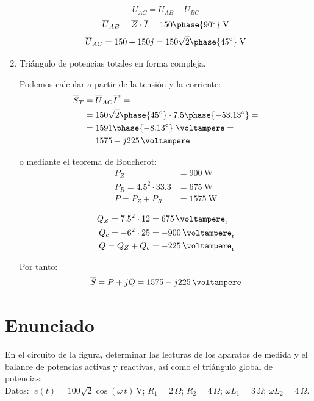 \begin{enumerate}
  \[
    \overline{U}_{AC} = \overline{U}_{AB} + \overline{U}_{BC}
  \]
  \[
    \overline{U}_{AB} = \overline{Z} \cdot \overline{I} = 150\phase{\ang{90}}\;\si{\volt}
  \]
  \[
    \overline{U}_{AC} = 150 + 150j = 150\sqrt{2}\phase{\ang{45}}\;\si{\volt}
  \]

\item Triángulo de potencias totales en forma compleja.

  Podemos calcular a partir de la tensión y la corriente:
  \begin{align*}
    \overline{S}_T &= \overline{U}_{AC} \overline{I}^* =\\
                   &= 150\sqrt{2}\phase{\ang{45}} \cdot 7.5\phase{\ang{-53.13}} =\\
                   &= 1591\phase{\ang{-8.13}}\;\si{\voltampere}=\\
                   &= \qty[parse-numbers=false]{1575 - j225}{\voltampere}
  \end{align*}
  
  o mediante el teorema de Boucherot:
  \begin{align*}
    P_Z &= \qty{900}{\watt}\\
    P_R = 4.5^2 \cdot 33.3 &= \qty{675}{\watt}\\
    P = P_Z + P_R &= \qty{1575}{\watt}
  \end{align*}

    \vspace{-4mm}
  \begin{align*}
    Q_Z = 7.5^2 \cdot 12 &= \qty{675}{\voltampere_r}\\
    Q_c = - 6^2 \cdot 25 &= \qty{-900}{\voltampere_r}\\
    Q = Q_Z + Q_c &= \qty{-225}{\voltampere_r}
  \end{align*}
  
  Por tanto:
  \[
    \overline{S} = P + jQ = \qty[parse-numbers=false]{1575 - j225}{\voltampere}
  \]
  
\end{enumerate}


\section{Enunciado}

En el circuito de la figura, determinar las lecturas de los aparatos de medida y el balance de potencias activas y reactivas, así como el triángulo global de potencias.\\
Datos: $\; e(t)=100\sqrt{2}\cos(\omega\,t)\,\si{\volt}$;\; $R_1=2\,\Omega$;\;
$R_2=4\,\Omega$;\; $\omega L_1=3\,\Omega$;\; $\omega L_2=4\,\Omega$.

